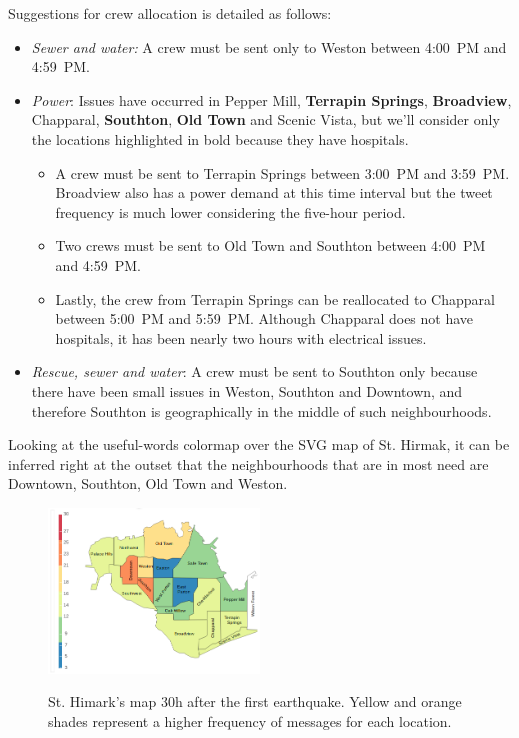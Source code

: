 Suggestions for crew allocation is detailed as follows: 

\begin{itemize}
    \item \emph{Sewer and water:} A crew must be sent only to Weston between 
    4:00~PM and 4:59~PM.
    \smallskip 
    \item \emph{Power}: Issues have occurred in Pepper Mill, \textbf{Terrapin
    Springs}, \textbf{Broadview}, Chapparal, \textbf{Southton}, \textbf{Old 
    Town} and Scenic Vista, but we'll consider only the locations 
    highlighted in bold because they have hospitals.
    \begin{itemize}
        \item A crew must be sent to Terrapin Springs between 3:00~PM and
        3:59~PM. Broadview also has a power demand at this time interval but the
        tweet frequency is much lower considering the five-hour period.
        \item Two crews must be sent to Old Town and Southton between 4:00~PM 
        and 4:59~PM.
        \item Lastly, the crew from Terrapin Springs can be reallocated to
        Chapparal between 5:00~PM and 5:59~PM. Although Chapparal does not have
        hospitals, it has been nearly two hours with electrical issues.
    \end{itemize}
    \item \emph{Rescue, sewer and water}: A crew must be sent to Southton only
    because there have been small issues in Weston, Southton and Downtown, and
    therefore Southton is geographically in the middle of such neighbourhoods.
\end{itemize}

Looking at the useful-words colormap over the SVG map of St. Hirmak, it can be
inferred right at the outset that the neighbourhoods that are in most need are
Downtown, Southton, Old Town and Weston.

\begin{figure}[!h]
    \centering
    \includegraphics[width=0.50\textwidth]{figs/q1/cond_30h/cond_30h_svg.png}
    \label{fig:map_30h}
    \caption{St. Himark's map 30h after the first earthquake. Yellow and orange 
    shades represent a higher frequency of messages for each location.}
\end{figure}

